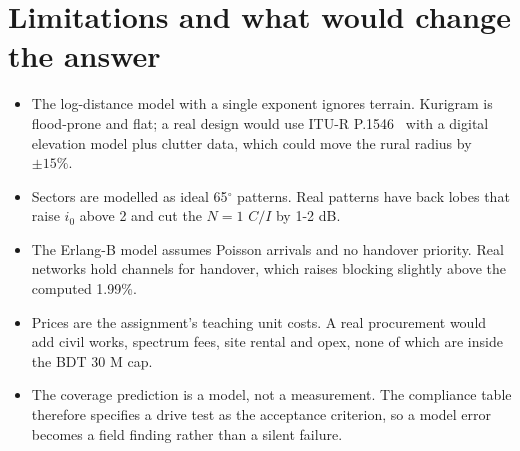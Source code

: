 \documentclass[9pt,a4paper]{article}
\begin{document}
\section{Limitations and what would change the answer}
\begin{itemize}[leftmargin=1.4em,itemsep=1pt,topsep=2pt]
\item The log-distance model with a single exponent ignores terrain. Kurigram is flood-prone and
flat; a real design would use ITU-R P.1546~\cite{p1546} with a digital elevation model plus clutter data, which
could move the rural radius by $\pm15\%$.
\item Sectors are modelled as ideal 65$^\circ$ patterns. Real patterns have back lobes that raise
$i_0$ above 2 and cut the $N=1$ $C/I$ by 1-2 dB.
\item The Erlang-B model assumes Poisson arrivals and no handover priority. Real networks hold
channels for handover, which raises blocking slightly above the computed 1.99\%.
\item Prices are the assignment's teaching unit costs. A real procurement would add civil works,
spectrum fees, site rental and opex, none of which are inside the BDT 30 M cap.
\item The coverage prediction is a model, not a measurement. The compliance table therefore
specifies a drive test as the acceptance criterion, so a model error becomes a field finding
rather than a silent failure.
\end{itemize}
\end{document}
